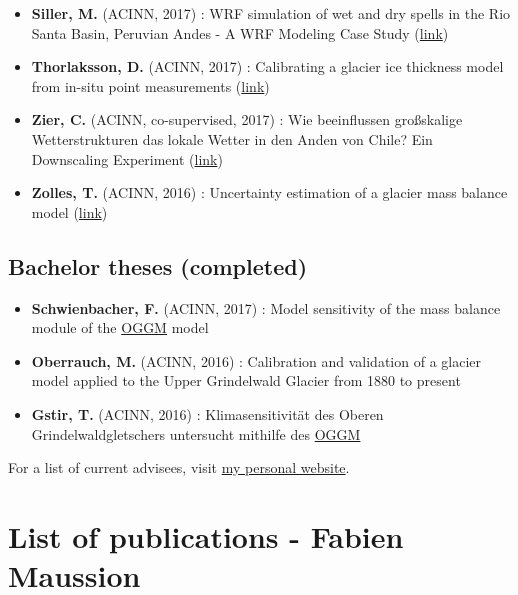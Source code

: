 \begin{itemize}[nosep]
\item {} 
\textbf{Siller, M.} (ACINN, 2017)
: WRF simulation of wet and dry spells in the Rio Santa Basin, Peruvian Andes - A WRF Modeling Case Study (\href{http://diglib.uibk.ac.at/urn:nbn:at:at-ubi:1-7816}{link})

\item {} 
\textbf{Thorlaksson, D.} (ACINN, 2017)
: Calibrating a glacier ice thickness model from in-situ point measurements (\href{http://diglib.uibk.ac.at/urn:nbn:at:at-ubi:1-7259}{link})

\item {} 
\textbf{Zier, C.} (ACINN, co-supervised, 2017)
: Wie beeinflussen großskalige Wetterstrukturen das lokale Wetter in den Anden von Chile? Ein Downscaling Experiment (\href{http://diglib.uibk.ac.at/urn:nbn:at:at-ubi:1-7092}{link})

\item {} 
\textbf{Zolles, T.} (ACINN, 2016)
: Uncertainty estimation of a glacier mass balance model (\href{http://diglib.uibk.ac.at/urn:nbn:at:at-ubi:1-5240}{link})

\end{itemize}


\subsection*{Bachelor theses (completed)}
\label{\detokenize{ch08/cv:bachelor-theses-completed}}\begin{itemize}[nosep]
\item {} 
\textbf{Schwienbacher, F.} (ACINN, 2017)
: Model sensitivity of the mass balance module of the \href{http://oggm.org/}{OGGM} model

\item {} 
\textbf{Oberrauch, M.} (ACINN, 2016)
: Calibration and validation of a glacier model applied to the Upper Grindelwald Glacier from 1880 to present

\item {} 
\textbf{Gstir, T.}  (ACINN, 2016)
: Klimasensitivität des Oberen Grindelwaldgletschers untersucht mithilfe des \href{http://oggm.org}{OGGM}

\end{itemize}

For a list of current advisees, visit \href{https://fabienmaussion.info/team/}{my personal website}.


\clearpage

\section*{List of publications - Fabien Maussion}


